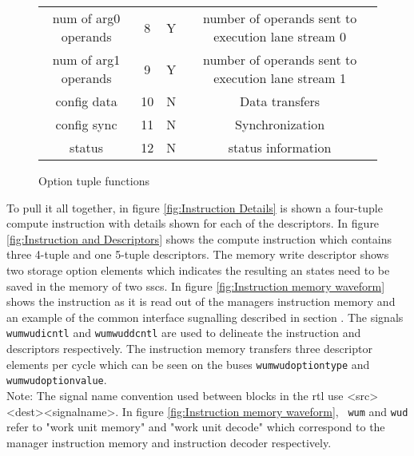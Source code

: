 \begin{figure}[!t]
\begin{minipage}{1\textwidth}
\begin{minipage}{0.85\textwidth}
\begin{adjustbox}{width=1\textwidth}
\begin{tabular}{ |c|c|c|c|  }
              num of arg0 operands             &    8   &  Y&  number of operands sent to execution lane stream 0\\
              num of arg1 operands             &    9   &  Y&  number of operands sent to execution lane stream 1\\
              config data                      &   10   &  N&  Data transfers\\
              config sync                      &   11   &  N&  Synchronization \\
              status                           &   12   &  N&  status information \\
              \hline
            \end{tabular}
        \end{adjustbox}
        \caption{Option tuple functions}
        \label{tab:Option tuple functions}
    \end{minipage}
  \end{minipage}
\end{figure}


To pull it all together, in figure \ref{fig:Instruction Details} is shown a four-tuple compute instruction with details shown for each of the descriptors.
In figure \ref{fig:Instruction and Descriptors} shows the compute instruction which contains three 4-tuple and one 5-tuple descriptors.
The memory write descriptor shows two storage option elements which indicates the resulting \ac{an} states need to be saved in the memory of two \acp{ssc}.
In figure \ref{fig:Instruction memory waveform} shows the instruction as it is read out of the managers instruction memory and an example of the common interface sugnalling described in section \label{sec:Common Bus Signalling}.
The signals \texttt{wum\textunderscore\textunderscore wud\textunderscore\textunderscore icntl} and \texttt{wum\textunderscore\textunderscore wud\textunderscore\textunderscore dcntl} are used to delineate the instruction and descriptors respectively.
The instruction memory transfers three descriptor elements per cycle which can be seen on the buses \texttt{wum\textunderscore\textunderscore wud\textunderscore\textunderscore option\textunderscore type} and \texttt{wum\textunderscore\textunderscore wud\textunderscore\textunderscore option\textunderscore value}.
\\
Note: The signal name convention used between blocks in the \ac{rtl} use <src>\textunderscore\textunderscore <dest>\textunderscore\textunderscore <signal\textunderscore\textunderscore  name>. In figure \ref{fig:Instruction memory waveform},~ \texttt{wum} and \texttt{wud} refer to "work unit memory" and "work unit decode"
which correspond to the manager instruction memory and instruction decoder respectively.

